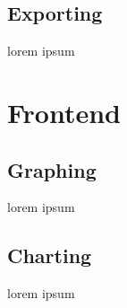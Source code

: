 \documentclass{article}
\begin{document}
\subsection{Exporting}
lorem ipsum



\section{Frontend}

\subsection{Graphing}
lorem ipsum

\subsection{Charting}
lorem ipsum


\end{document}
